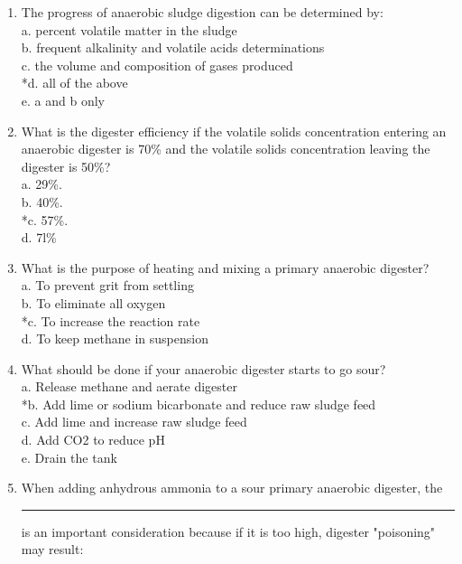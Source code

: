 \documentclass{article}
\begin{document}
\begin{enumerate}
\item  The progress of anaerobic sludge digestion can be determined by: \\

a. percent volatile matter in the sludge \\
b. frequent alkalinity and volatile acids determinations \\
c. the volume and composition of gases produced \\
*d. all of the above \\
e. a and b only \\

\item  What is the digester efficiency if the volatile solids concentration entering an anaerobic digester is 70\% and the volatile solids concentration leaving the digester is 50\%? \\

a. 29\%. \\
b. 40\%. \\
*c. 57\%. \\
d. 7l\% \\

\item  What is the purpose of heating and mixing a primary anaerobic digester? \\

a. To prevent grit from settling \\
b. To eliminate all oxygen \\
*c. To increase the reaction rate \\
d. To keep methane in suspension \\

\item  What should be done if your anaerobic digester starts to go sour? \\

a. Release methane and aerate digester \\
*b. Add lime or sodium bicarbonate and reduce raw sludge feed \\
c. Add lime and increase raw sludge feed \\
d. Add CO2 to reduce pH \\
e. Drain the tank \\

\item  When adding anhydrous ammonia to a sour primary anaerobic digester, the \rule{1.5cm}{0.3mm} is an important consideration because if it is too high, digester "poisoning" may result: \\


\end{enumerate}
\end{document}

